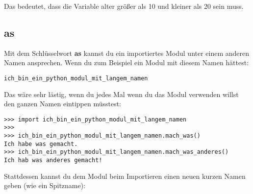 \noindent
Das bedeutet, dass die Variable alter größer als 10 und kleiner als 20 sein muss.

\subsection*{as}

Mit dem Schlüsselwort \textbf{as} kannst du ein importiertes Modul unter einem anderen Namen ansprechen. Wenn du zum Beispiel ein Modul mit diesem Namen hättest:

\begin{Verbatim}[frame=single]
ich_bin_ein_python_modul_mit_langem_namen
\end{Verbatim}

\noindent
Das wäre sehr lästig, wenn du jedes Mal wenn du das Modul verwenden willst den ganzen Namen eintippen müsstest:

\begin{Verbatim}[frame=single]
>>> import ich_bin_ein_python_modul_mit_langem_namen
>>>
>>> ich_bin_ein_python_modul_mit_langem_namen.mach_was()
Ich habe was gemacht.
>>> ich_bin_ein_python_modul_mit_langem_namen.mach_was_anderes()
Ich hab was anderes gemacht!
\end{Verbatim}

\noindent
Stattdessen kannst du dem Modul beim Importieren einen neuen kurzen Namen geben (wie ein Spitzname):

